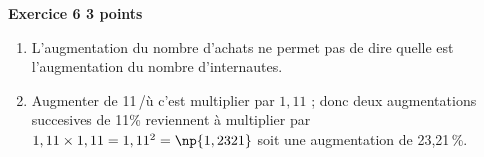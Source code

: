\textbf{Exercice 6 \hfill 3 points}

\medskip

% 
%

\begin{enumerate}
\item %
L'augmentation du nombre d'achats ne permet pas de dire quelle est l'augmentation du nombre d'internautes. 
\item %
Augmenter de 11\,/ù c'est multiplier par $1,11$ ; donc deux augmentations succesives de 11\;\% reviennent à multiplier par $1,11 \times 1,11 = 1,11^2 = \np{1,2321}$ soit une augmentation de 23,21\,\%.
\end{enumerate}
 
\bigskip

